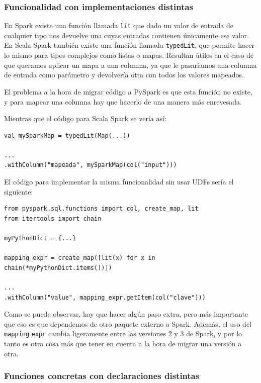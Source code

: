 \documentclass[12pt,twoside,titlepage]{report}
\begin{document}
\subsubsection{Funcionalidad con implementaciones distintas}

En Spark existe una función llamada \texttt{lit} que dado un valor de entrada de cualquier tipo nos devuelve una cuyas entradas contienen únicamente ese valor. En Scala Spark también existe una función llamada \texttt{typedLit}, que permite hacer lo mismo para tipos complejos como listas o mapas. Resultan útiles en el caso de que queramos aplicar un mapa a una columna, ya que le pasaríamos una columna de entrada como parámetro y devolvería otra con todos los valores mapeados. 

El problema a la hora de migrar código a PySpark es que esta función no existe, y para mapear una columna hay que hacerlo de una manera más enrevesada.

Mientras que el código para Scala Spark se vería así:

\begin{lstlisting}
val mySparkMap = typedLit(Map(...))

...
.withColumn("mapeada", mySparkMap(col("input")))
\end{lstlisting}

El código para implementar la misma funcionalidad sin usar UDFs sería el siguiente:

\begin{lstlisting}
from pyspark.sql.functions import col, create_map, lit
from itertools import chain

myPythonDict = {...}

mapping_expr = create_map([lit(x) for x in chain(*myPythonDict.items())])

...
.withColumn("value", mapping_expr.getItem(col("clave")))
\end{lstlisting}

Como se puede observar, hay que hacer algún paso extra, pero más importante que eso es que dependemos de otro paquete externo a Spark. Además, el uso del \texttt{mapping$\_$expr} cambia ligeramente entre las versiones 2 y 3 de Spark, y por lo tanto es otra cosa más que tener en cuenta a la hora de migrar una versión a otra.

\subsubsection{Funciones concretas con declaraciones distintas}
\end{document}
